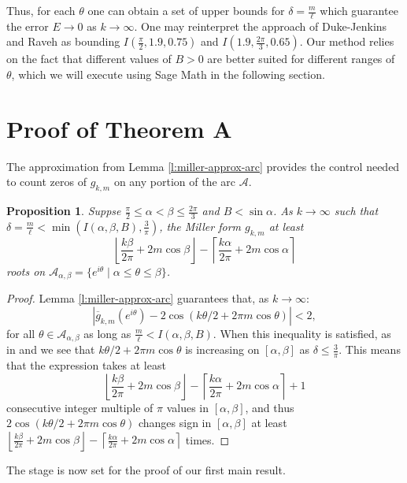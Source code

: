\documentclass[12pt]{amsart}
\theoremstyle{plain} %
\newtheorem{proposition}[theorem]{Proposition}
\theoremstyle{definition}
\theoremstyle{remark}
\numberwithin{equation}{section}
\begin{document}
Thus, for each $\theta$ one can obtain a set of upper bounds for
$\delta=\frac{m}{\ell}$ which guarantee the error $E\to 0$ as
$k\to \infty$. One may reinterpret the approach of Duke-Jenkins and Raveh as bounding $I(\frac{\pi}{2}, 1.9, 0.75)$ and $I(1.9,\frac{2\pi}{3}, 0.65)$. 
Our method relies on the fact that different values of $B>0$ are better suited for different ranges of $\theta$, which we will execute using Sage Math
\cite{sage} in the following section. 


\section{Proof of Theorem A}
The approximation from Lemma \ref{l:miller-approx-arc} provides the
control needed to count zeros of $g_{k,m}$ on any portion of the arc $\mathcal{A}$. 

\begin{proposition}\label{p:arc-count}
Suppse $\frac{\pi}{2}\leq \alpha<\beta\leq \frac{2\pi}{3}$ and
$B<\sin \alpha$. As $k\to\infty$ such that
$\delta=\frac{m}{\ell}<\min(I(\alpha,\beta,B),\frac{3}{\pi})$, the Miller form
$g_{k,m}$ at least
\[\left\lfloor\frac{k \beta}{2\pi}+2 m \cos
\beta\right\rfloor - \left\lceil\frac{k \alpha}{2\pi}+2 m
\cos \alpha \right\rceil\]
roots on $\mathcal{A}_{\alpha,\beta}=\{e^{i\theta}\mid
\alpha\leq \theta\leq \beta\}$.
\end{proposition}

\begin{proof}
Lemma \ref{l:miller-approx-arc} guarantees that, as $k\to\infty$:
\[|\overline{g}_{k,m}(e^{i\theta})-2\cos(k\theta/2+2\pi m\cos\theta)|<2,\]
for all $\theta\in \mathcal{A}_{\alpha,\beta}$ as long as
$\frac{m}{\ell}<I(\alpha,\beta,B)$. When this inequality is satisfied,
as in \cite[Lemma 3]{duke-jenkins} and \cite[\S
3.4]{raveh:miller} we see that $k\theta/2+2\pi m\cos\theta$ is
increasing on $[\alpha,\beta]$ as
$\delta\leq\frac{3}{\pi}$. This means that the expression takes
at least
\[\left\lfloor\frac{k \beta}{2\pi}+2 m \cos
\beta\right\rfloor - \left\lceil\frac{k \alpha}{2\pi}+2 m
\cos \alpha \right\rceil+1\]
consecutive integer multiple of $\pi$ values in $[\alpha,\beta]$, and thus $2\cos(k\theta/2+2\pi m\cos\theta)$ changes sign in $[\alpha,\beta]$ at least $\left\lfloor\frac{k \beta}{2\pi}+2 m \cos
\beta\right\rfloor - \left\lceil\frac{k \alpha}{2\pi}+2 m
\cos \alpha \right\rceil$ times.
\end{proof}

The stage is now set for the proof of our first main result.
\end{document}
